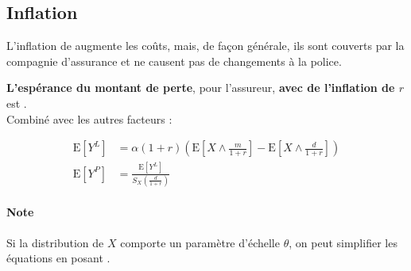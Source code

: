 \documentclass[10pt, french]{article}
\begin{document}
\begin{multicols*}{2}


\columnbreak
\subsection{Inflation}
\begin{definitionNOHFILL}[Inflation $r$]
L'inflation de  augmente les coûts, mais, de façon générale, ils sont couverts par la compagnie d'assurance et ne causent pas de changements à la police.
\end{definitionNOHFILL}

\begin{definitionNOHFILLsub}
\textbf{L'espérance du montant de perte}, pour l'assureur, \textbf{avec de l'inflation de $r$} est .\\

Combiné avec les autres facteurs :

\begin{align*}
	\text{E}\left[Y^{L}\right]		
	&=	\alpha(1 + r) \left(\text{E}\left[X \wedge \frac{m}{1 + r}\right]	-	\text{E}\left[X \wedge \frac{d}{1 + r}\right]\right)	\\
	\text{E}\left[Y^{P}\right]	
	&=	\frac{\text{E}[Y^{L}]}{S_{X}\left(\frac{d}{1 + r}\right)}
\end{align*}
\end{definitionNOHFILLsub}

\paragraph{Note}	Si la distribution de $X$ comporte un paramètre d'échelle $\theta$, on peut simplifier les équations en posant .




\end{multicols*}
\end{document}
